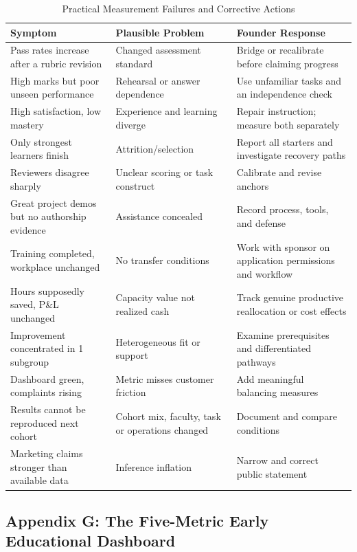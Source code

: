 \begin{table}[t]
\centering
\small
\caption{Practical Measurement Failures and Corrective Actions}
\begin{tabularx}{\textwidth}{p{}p{}X}
\toprule
\textbf{Symptom} & \textbf{Plausible Problem} & \textbf{Founder Response} \\
\midrule
Pass rates increase after a rubric revision & Changed assessment standard & Bridge or recalibrate before claiming progress \\
High marks but poor unseen performance & Rehearsal or answer dependence & Use unfamiliar tasks and an independence check \\
High satisfaction, low mastery & Experience and learning diverge & Repair instruction; measure both separately \\
Only strongest learners finish & Attrition/selection & Report all starters and investigate recovery paths \\
Reviewers disagree sharply & Unclear scoring or task construct & Calibrate and revise anchors \\
Great project demos but no authorship evidence & Assistance concealed & Record process, tools, and defense \\
Training completed, workplace unchanged & No transfer conditions & Work with sponsor on application permissions and workflow \\
Hours supposedly saved, P\&L unchanged & Capacity value not realized cash & Track genuine productive reallocation or cost effects \\
Improvement concentrated in 1 subgroup & Heterogeneous fit or support & Examine prerequisites and differentiated pathways \\
Dashboard green, complaints rising & Metric misses customer friction & Add meaningful balancing measures \\
Results cannot be reproduced next cohort & Cohort mix, faculty, task or operations changed & Document and compare conditions \\
Marketing claims stronger than available data & Inference inflation & Narrow and correct public statement \\
\bottomrule
\end{tabularx}
\end{table}

\subsection*{Appendix G: The Five-Metric Early Educational Dashboard}

